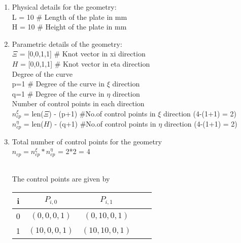 \documentclass[12pt]{article}
\begin{document}
\begin{enumerate}
\item Physical details for the geometry: \\
	L = 10 \qquad \# Length of the plate in mm \\
	H = 10 \qquad \# Height of the plate in mm \\

\item Parametric details of the geometry: \\
	$\Xi$ = [0,0,1,1] \qquad \# Knot vector in xi  direction \\
	$H$ = [0,0,1,1] \qquad \# Knot vector in eta direction \\

    Degree of the curve \\
	p=1 \qquad \# Degree of the curve in $\xi$  direction \\
	q=1 \qquad \# Degree of the curve in $\eta$ direction \\

	Number of control points in each direction \\
	$n_{cp}^{\xi}$  = len($\Xi$) - (p+1)  \qquad \#No.of control points in $\xi$ direction (4-(1+1) = 2) \\
	$n_{cp}^{\eta}$ = len($H$) - (q+1)  \qquad \#No.of control points in $\eta$ direction (4-(1+1) = 2) \\

\item Total number of control points for the geometry \\
$n_{cp} = n_{cp}^{\xi} * n_{cp}^{\eta}$ = 2*2 = 4
\begin{comment}
\item Control points net for the geometry \\
P = [[[0,0,0,1],[L,0,0,1]],
[[0,L,0,1],[L,L,0,1]]]

$$
P = \begin{bmatrix}
	[0,0,0,1] & [L,0,0,1] \\
	[L,0,0,1] & [L,L,0,1] \\
\end{bmatrix} 
$$

\end{enumerate}
\end{comment}
\\
The control points are given by
\begin{center}
	\begin{tabular}{ |c|c|c|c|c| } 
		\hline
		i & $ P_{i,0} $ & $ P_{i,1} $  \\ \hline
		0 & $ (0,0,0,1) $ & $ (0,10,0,1) $  \\ \hline
		1 & $ (10,0,0,1) $ & $ (10,10,0,1) $  \\ \hline


\end{tabular}
\end{center}
\end{enumerate}
\end{document}
